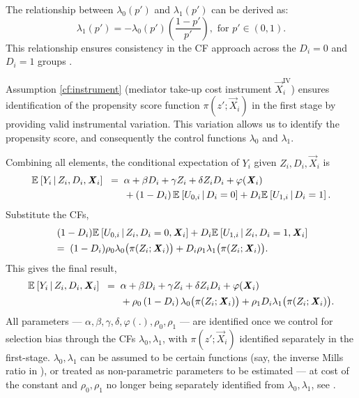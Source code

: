 The relationship between $\lambda_0(p')$ and $\lambda_1(p')$ can be derived as:
\[ \lambda_1 \left(p'\right) = -\lambda_0 \left(p'\right) \left( \frac{1-p'}{p'} \right), \text{ for } p' \in (0,1). \]
This relationship ensures consistency in the CF approach across the $D_i=0$ and $D_i= 1$ groups \citep{kline2019heckits}.

Assumption \ref{cf:instrument} (mediator take-up cost instrument $\vec X_i^{\text{IV}}$) ensures identification of the propensity score function $\pi(z'; \vec X_i)$ in the first stage by providing valid instrumental variation.
This variation allows us to identify the propensity score, and consequently the control functions $\lambda_0$ and $\lambda_1$.

Combining all elements, the conditional expectation of $Y_i$ given $Z_i, D_i, \vec X_i$ is
\begin{align*}
    \mathbb{E}_{} \left[ Y_i \, \middle\vert \, Z_i, D_i, \boldsymbol{\mathit{X}}_i \right] \;\; =& \;\;
        \alpha
        + \beta D_i
        + \gamma Z_i
        + \delta Z_i D_i
        + \varphi(\boldsymbol{\mathit{X}}_i) \\
        & \;\; + \left( 1 - D_i \right) \mathbb{E}_{} \left[ U_{0,i} \, \middle\vert \, D_i = 0 \right]
            + D_i \mathbb{E}_{} \left[ U_{1,i} \, \middle\vert \, D_i = 1 \right].
\end{align*}
Substitute the CFs,
\begin{align*}
    &\;(1-D_i) \mathbb{E}_{} \left[  U_{0,i}  \, \middle\vert \, Z_i, D_i=0, \boldsymbol{\mathit{X}}_i \right]
        + D_i \mathbb{E}_{} \left[  U_{1,i} \, \middle\vert \, Z_i, D_i=1, \boldsymbol{\mathit{X}}_i \right] \\
    &=\; (1-D_i)\rho_0 \lambda_0 \big(\pi(Z_i; \boldsymbol{\mathit{X}}_i) \big)
    + D_i \rho_1 \lambda_1 \big(\pi(Z_i; \boldsymbol{\mathit{X}}_i) \big).
\end{align*}
This gives the final result,
\begin{align*}
    \mathbb{E}_{} \left[ Y_i \, \middle\vert \, Z_i, D_i, \boldsymbol{\mathit{X}}_i \right] \;\; =& \;\;
        \alpha
        + \beta D_i
        + \gamma Z_i
        + \delta Z_i D_i
        + \varphi(\boldsymbol{\mathit{X}}_i) \\
        & \;\; +  \rho_0 \left( 1 - D_i \right) \lambda_0 \big( \pi(Z_i ; \boldsymbol{\mathit{X}}_i) \big)
            + \rho_1 D_i \lambda_1 \big( \pi(Z_i ; \boldsymbol{\mathit{X}}_i) \big).
\end{align*}
All parameters --- $\alpha, \beta, \gamma, \delta, \varphi(.), \rho_0, \rho_1$ --- are identified once we control for selection bias through the CFs $\lambda_0, \lambda_1$, with $\pi(z';\vec X_i)$ identified separately in the first-stage.
$\lambda_0, \lambda_1$ can be assumed to be certain functions (say, the inverse Mills ratio in \citealt{heckman1979sample}), or treated as non-parametric parameters to be estimated --- at cost of the constant and $\rho_0, \rho_1$ no longer being separately identified from $\lambda_0, \lambda_1$, see .

